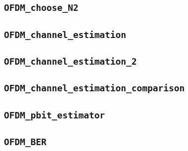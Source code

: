 \documentclass[10pt]{article}
\numberwithin{equation}{section}
\begin{document}
\subsection*{\texttt{OFDM\_choose\_N2}}


\subsection*{\texttt{OFDM\_channel\_estimation}}


\subsection*{\texttt{OFDM\_channel\_estimation\_2}}


\subsection*{\texttt{OFDM\_channel\_estimation\_comparison}}


\subsection*{\texttt{OFDM\_pbit\_estimator}}


\subsection*{\texttt{OFDM\_BER}}

\end{document}
